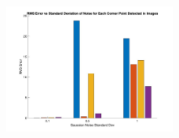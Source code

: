 \documentclass[12pt]{article}
\begin{document}
\begin{enumerate}
\begin{enumerate}
\begin{figure}[H]
			\includegraphics[width=0.5\textwidth]{Q6C_final_distribution_result.jpg}
		\end{figure}
	\end{enumerate}
		
		
\end{enumerate}
%
\end{document}
